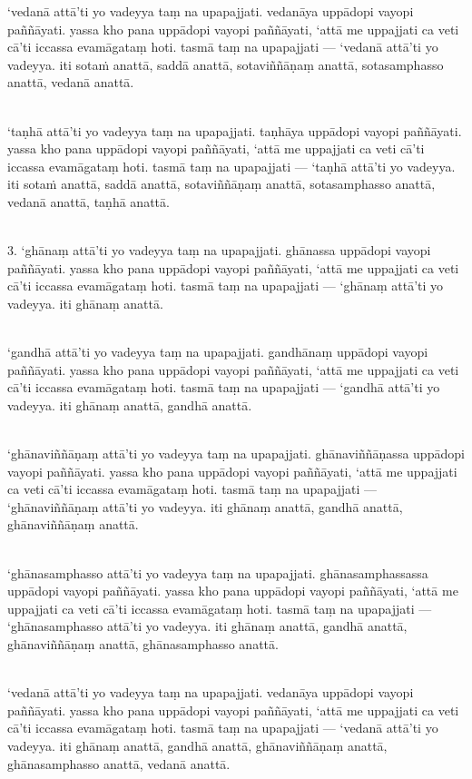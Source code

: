 \documentclass[9pt]{article}
\begin{document}
‘vedanā attā’ti yo vadeyya taṃ na upapajjati. vedanāya uppādopi vayopi paññāyati. yassa kho pana uppādopi vayopi paññāyati, ‘attā me uppajjati ca veti cā’ti iccassa evamāgataṃ hoti. tasmā taṃ na upapajjati — ‘vedanā attā’ti yo vadeyya. iti sotaṁ anattā, saddā anattā, sotaviññāṇaṃ anattā, sotasamphasso anattā, vedanā anattā.\\\

‘taṇhā attā’ti yo vadeyya taṃ na upapajjati. taṇhāya uppādopi vayopi paññāyati. yassa kho pana uppādopi vayopi paññāyati, ‘attā me uppajjati ca veti cā’ti iccassa evamāgataṃ hoti. tasmā taṃ na upapajjati — ‘taṇhā attā’ti yo vadeyya. iti sotaṁ anattā, saddā anattā, sotaviññāṇaṃ anattā, sotasamphasso anattā, vedanā anattā, taṇhā anattā.\\\

3. ‘ghānaṃ attā’ti yo vadeyya taṃ na upapajjati. ghānassa uppādopi vayopi paññāyati. yassa kho pana uppādopi vayopi paññāyati, ‘attā me uppajjati ca veti cā’ti iccassa evamāgataṃ hoti. tasmā taṃ na upapajjati — ‘ghānaṃ attā’ti yo vadeyya. iti ghānaṃ anattā.\\\

‘gandhā attā’ti yo vadeyya taṃ na upapajjati. gandhānaṃ uppādopi vayopi paññāyati. yassa kho pana uppādopi vayopi paññāyati, ‘attā me uppajjati ca veti cā’ti iccassa evamāgataṃ hoti. tasmā taṃ na upapajjati — ‘gandhā attā’ti yo vadeyya. iti ghānaṃ anattā, gandhā anattā.\\\

‘ghānaviññāṇaṃ attā’ti yo vadeyya taṃ na upapajjati. ghānaviññāṇassa uppādopi vayopi paññāyati. yassa kho pana uppādopi vayopi paññāyati, ‘attā me uppajjati ca veti cā’ti iccassa evamāgataṃ hoti. tasmā taṃ na upapajjati — ‘ghānaviññāṇaṃ attā’ti yo vadeyya. iti ghānaṃ anattā, gandhā anattā, ghānaviññāṇaṃ anattā.\\\

‘ghānasamphasso attā’ti yo vadeyya taṃ na upapajjati. ghānasamphassassa uppādopi vayopi paññāyati. yassa kho pana uppādopi vayopi paññāyati, ‘attā me uppajjati ca veti cā’ti iccassa evamāgataṃ hoti. tasmā taṃ na upapajjati — ‘ghānasamphasso attā’ti yo vadeyya. iti ghānaṃ anattā, gandhā anattā, ghānaviññāṇaṃ anattā, ghānasamphasso anattā.\\\

‘vedanā attā’ti yo vadeyya taṃ na upapajjati. vedanāya uppādopi vayopi paññāyati. yassa kho pana uppādopi vayopi paññāyati, ‘attā me uppajjati ca veti cā’ti iccassa evamāgataṃ hoti. tasmā taṃ na upapajjati — ‘vedanā attā’ti yo vadeyya. iti ghānaṃ anattā, gandhā anattā, ghānaviññāṇaṃ anattā, ghānasamphasso anattā, vedanā anattā.\\\
\end{document}
